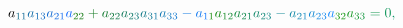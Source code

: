 \documentclass[12pt]{article}
\begin{document}
\begin{displaymath}
{a} _ { \mathcolor[RGB]{15,105,135}{1} \mathcolor[RGB]{15,105,150}{1} } \mathcolor[RGB]{15,105,165}{a} _ { \mathcolor[RGB]{15,105,180}{1} \mathcolor[RGB]{15,105,195}{3} } \mathcolor[RGB]{15,105,210}{a} _ { \mathcolor[RGB]{15,105,225}{2} \mathcolor[RGB]{15,105,240}{1} } \mathcolor[RGB]{15,105,255}{a} _ { \mathcolor[RGB]{15,120,0}{2} \mathcolor[RGB]{15,120,15}{2} } \mathcolor[RGB]{15,120,30}{+} \mathcolor[RGB]{15,120,45}{a} _ { \mathcolor[RGB]{15,120,60}{2} \mathcolor[RGB]{15,120,75}{2} } \mathcolor[RGB]{15,120,90}{a} _ { \mathcolor[RGB]{15,120,105}{2} \mathcolor[RGB]{15,120,120}{3} } \mathcolor[RGB]{15,120,135}{a} _ { \mathcolor[RGB]{15,120,150}{3} \mathcolor[RGB]{15,120,165}{1} } \mathcolor[RGB]{15,120,180}{a} _ { \mathcolor[RGB]{15,120,195}{3} \mathcolor[RGB]{15,120,210}{3} } \mathcolor[RGB]{15,120,225}{-} \mathcolor[RGB]{15,120,240}{a} _ { \mathcolor[RGB]{15,120,255}{1} \mathcolor[RGB]{15,135,0}{1} } \mathcolor[RGB]{15,135,15}{a} _ { \mathcolor[RGB]{15,135,30}{1} \mathcolor[RGB]{15,135,45}{2} } \mathcolor[RGB]{15,135,60}{a} _ { \mathcolor[RGB]{15,135,75}{2} \mathcolor[RGB]{15,135,90}{1} } \mathcolor[RGB]{15,135,105}{a} _ { \mathcolor[RGB]{15,135,120}{2} \mathcolor[RGB]{15,135,135}{3} } \mathcolor[RGB]{15,135,150}{-} \mathcolor[RGB]{15,135,165}{a} _ { \mathcolor[RGB]{15,135,180}{2} \mathcolor[RGB]{15,135,195}{1} } \mathcolor[RGB]{15,135,210}{a} _ { \mathcolor[RGB]{15,135,225}{2} \mathcolor[RGB]{15,135,240}{3} } \mathcolor[RGB]{15,135,255}{a} _ { \mathcolor[RGB]{15,150,0}{3} \mathcolor[RGB]{15,150,15}{2} } \mathcolor[RGB]{15,150,30}{a} _ { \mathcolor[RGB]{15,150,45}{3} \mathcolor[RGB]{15,150,60}{3} } \mathcolor[RGB]{15,150,75}{=} \mathcolor[RGB]{15,150,90}{0} \mathcolor[RGB]{15,150,105}{,} \mathcolor[RGB]{15,150,120}{\,
}
\end{displaymath}
\end{document}
